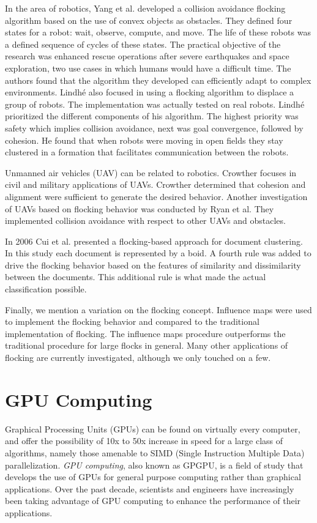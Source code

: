 In the area of robotics, Yang et al.\cite{flockingRobots} developed a collision avoidance flocking algorithm based on the use of convex objects as obstacles. They defined four states for a robot: wait, observe, compute, and move. The life of these robots was a defined sequence of cycles of these states. The practical objective of the research was enhanced rescue operations after severe earthquakes and space exploration, two use cases in which humans would have a difficult time. The authors found that the algorithm they developed can efficiently adapt to complex environments. Lindh\'{e} also focused in using a flocking algorithm to displace a group of robots\cite{flockingRobotsThesis}. The implementation was actually tested on real robots. Lindh\'{e} prioritized the different components of his algorithm. The highest priority was safety which implies collision avoidance, next was goal convergence, followed by cohesion. He found that when robots were moving in open fields they stay clustered in a formation that facilitates communication between the robots. 

Unmanned air vehicles (UAV) can be related to robotics. Crowther\cite{flockingUAV} focuses in civil and military applications of UAVs. Crowther determined that cohesion and alignment were sufficient to generate the desired behavior. Another investigation of UAVs based on flocking behavior was conducted by Ryan et al\cite{UAVControl}. They implemented collision avoidance with respect to other UAVs and obstacles. 

In 2006 Cui et al.\cite{document1} presented a flocking-based approach for document clustering. In this study each document is represented by a boid. A fourth rule was added to drive the flocking behavior based on the features of similarity and dissimilarity between the documents. This additional rule is what made the actual classification possible. 

Finally, we mention a variation on the flocking concept.  Influence maps were used to implement the flocking behavior and compared to the traditional implementation of flocking\cite{flockingInfluenceMaps}. The influence maps procedure outperforms the traditional procedure for large flocks in general. Many other applications of flocking are currently investigated, although we only touched on a few. 

\section{GPU Computing}
Graphical Processing Units (GPUs) can be found on virtually every computer, and offer the possibility of 10x to 50x increase in speed for a large class of algorithms, namely those amenable to SIMD (Single Instruction Multiple Data)  parallelization. \textit{GPU computing}, also known as GPGPU, is a field of study that develops the use of GPUs for general purpose computing rather than graphical applications. Over the past decade, scientists and engineers have increasingly been taking advantage of GPU computing to enhance the performance of their applications.

